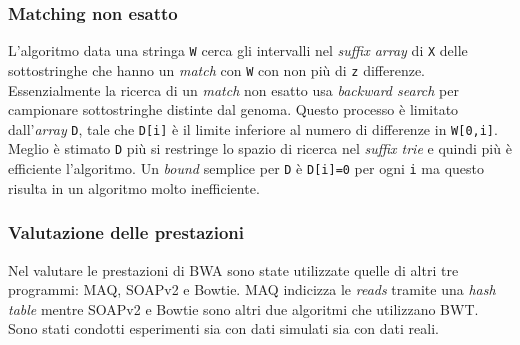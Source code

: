 \documentclass[conference]{IEEEtran}
\begin{document}
		\subsubsection{Matching non esatto}
		L'algoritmo data una stringa \texttt{W} cerca gli intervalli nel \textit{suffix array} di \texttt{X} delle sottostringhe che hanno un \textit{match} con \texttt{W} con non più di \texttt{z} differenze. Essenzialmente la ricerca di un \textit{match} non esatto usa \textit{backward search} per campionare sottostringhe distinte dal genoma. Questo processo è limitato dall'\textit{array} \texttt{D}, tale che \texttt{D[i]} è il limite inferiore al numero di differenze in \texttt{W[0,i]}. Meglio è stimato \texttt{D} più si restringe lo spazio di ricerca nel \textit{suffix trie} e quindi più è efficiente l'algoritmo. Un \textit{bound} semplice per \texttt{D} è \texttt{D[i]=0} per ogni \texttt{i} ma questo risulta in un algoritmo molto inefficiente.\\

		\subsubsection{Valutazione delle prestazioni}
		Nel valutare le prestazioni di BWA sono state utilizzate quelle di altri tre programmi: MAQ, SOAPv2 e Bowtie. MAQ indicizza le \textit{reads} tramite una \textit{hash table} mentre SOAPv2 e Bowtie sono altri due algoritmi che utilizzano BWT.
Sono stati condotti esperimenti sia con dati simulati sia con dati reali.\\
\end{document}
